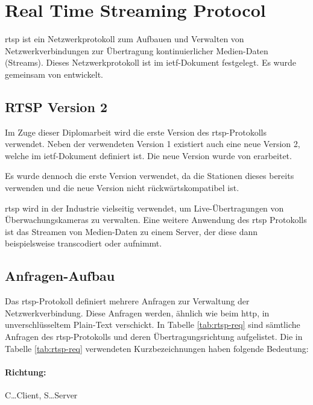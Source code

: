 \section{Real Time Streaming Protocol}
\ac{rtsp} ist ein Netzwerkprotokoll zum Aufbauen und Verwalten von Netzwerkverbindungen zur Übertragung kontinuierlicher Medien-Daten (Streams).
Dieses Netzwerkprotokoll ist im \ac{ietf}-Dokument  festgelegt. 
Es wurde gemeinsam von \citeauthor{ietf-rtsp} entwickelt. \cite[vgl.][]{ietf-rtsp}\par

\subsection{RTSP Version 2}
Im Zuge dieser Diplomarbeit wird die erste Version des \ac{rtsp}-Protokolls verwendet.
Neben der verwendeten Version 1 existiert auch eine neue Version 2, welche im \ac{ietf}-Dokument  definiert ist. Die neue Version wurde von \citeauthor{ietf-rtsp-2} erarbeitet. \cite[vgl.][]{ietf-rtsp-2}\par
Es wurde dennoch die erste Version verwendet, da die Stationen dieses bereits verwenden und die neue Version nicht rückwärtskompatibel ist.\par

\ac{rtsp} wird in der Industrie vielseitig verwendet, um Live-Übertragungen von Überwachungskameras zu verwalten. Eine weitere Anwendung des \ac{rtsp} Protokolls ist das Streamen von Medien-Daten zu einem Server, der diese dann beispielsweise transcodiert oder aufnimmt.

\subsection{Anfragen-Aufbau}
Das \ac{rtsp}-Protokoll definiert mehrere Anfragen zur Verwaltung der Netzwerkverbindung.
Diese Anfragen werden, ähnlich wie beim \ac{http}, in unverschlüsseltem Plain-Text verschickt.
In Tabelle \ref{tab:rtsp-req} sind sämtliche Anfragen des \ac{rtsp}-Protokolls und deren Übertragungsrichtung aufgelistet.
Die in Tabelle \ref{tab:rtsp-req} verwendeten Kurzbezeichnungen haben folgende Bedeutung:
\paragraph{Richtung:} C\dots Client, S\dots Server
